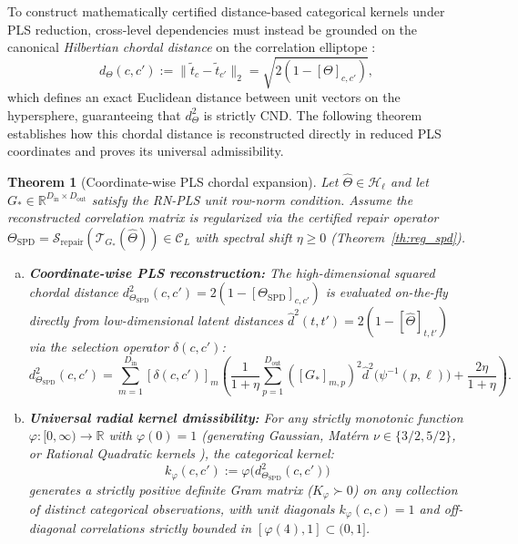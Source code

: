 \documentclass[default,sn-mathphys,Numbered]{sn-jnl}
\theoremstyle{thmstyleone}
\newtheorem{theorem}{Theorem}
\theoremstyle{thmstylethree}
\theoremstyle{thmstyletwo}
\newcommand{\inp}{\text{in}}
\newcommand{\outp}{\text{out}}
\begin{document}
To construct mathematically certified distance-based categorical kernels under PLS reduction, cross-level dependencies must instead be grounded on the canonical \textit{Hilbertian chordal distance} on the correlation elliptope \citep{haasdonk2004learning,Roustant,oune2021latent,saves2026hierarchical}:
\begin{equation}
\label{eq:hilbert_metric}
d_\Theta(c, c') := \|\widetilde{t}_c - \widetilde{t}_{c'}\|_2 = \sqrt{2\left(1 - [\Theta]_{c, c'}\right)},
\end{equation}
which defines an exact Euclidean distance between unit vectors on the hypersphere, guaranteeing that $d_\Theta^2$ is strictly CND. The following theorem establishes how this chordal distance is reconstructed directly in reduced PLS coordinates and proves its universal admissibility.

\begin{theorem}[Coordinate-wise PLS chordal expansion]
\label{th:hilbert_kernel_psd}
Let $\hat{\Theta} \in \mathcal{H}_\ell$ and let $G_* \in \mathbb{R}^{D_{\inp} \times D_{\outp}}$ satisfy the RN-PLS unit row-norm condition. Assume the reconstructed correlation matrix is regularized via the certified repair operator $\Theta_{\mathrm{SPD}} = \mathcal{S}_{\mathrm{repair}}(\mathcal{T}_{G_*}(\hat{\Theta})) \in \mathcal{C}_L$ with spectral shift $\eta \ge 0$ (Theorem~\ref{th:reg_spd}).
\begin{enumerate}[(a)]
    \item \textbf{Coordinate-wise PLS reconstruction:} The high-dimensional squared chordal distance $d_{\Theta_{\mathrm{SPD}}}^2(c, c') = 2(1 - [\Theta_{\mathrm{SPD}}]_{c, c'})$ is evaluated on-the-fly directly from low-dimensional latent distances $\hat{d}^2(t, t') = 2(1 - [\hat{\Theta}]_{t, t'})$ via the selection operator $\delta(c, c')$:
    \begin{equation}
    \label{eq:d_pls_expansion}
    d_{\Theta_{\mathrm{SPD}}}^2(c, c') = \sum_{m=1}^{D_{\inp}} [\delta(c, c')]_m \left( \frac{1}{1+\eta} \sum_{p=1}^{D_{\outp}} \left([G_*]_{m, p}\right)^2 \hat{d}^2\bigl(\psi^{-1}(p, \ell)\bigr) + \frac{2\eta}{1+\eta} \right).
    \end{equation}
    \item \textbf{Universal radial kernel dmissibility:} For any strictly  monotonic function $\varphi : [0, \infty) \to \mathbb{R}$ with $\varphi(0) = 1$ (generating Gaussian, Mat\'ern $\nu \in \{3/2, 5/2\}$, or Rational Quadratic kernels \citep{schoenberg1938metric,micchelli1986interpolation}), the categorical kernel:
    \begin{equation}
    \label{eq:universal_dist_kernel}
    k_\varphi(c, c') := \varphi\bigl(d_{\Theta_{\mathrm{SPD}}}^2(c, c')\bigr)
    \end{equation}
    generates a strictly positive definite Gram matrix ($K_\varphi \succ 0$) on any collection of distinct categorical observations, with unit diagonals $k_\varphi(c, c) = 1$ and off-diagonal correlations strictly bounded in $[\varphi(4), 1] \subset (0, 1]$.
\end{enumerate}
\end{theorem}
\end{document}
